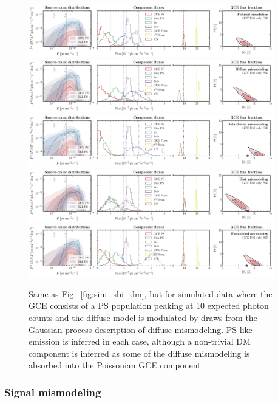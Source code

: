 \documentclass[prd,aps,10pt,nofootinbib,twocolumn,superscriptaddress,preprintnumbers,balancelastpage,longbibliography]{revtex4-1}
\begin{document}
%
\begin{figure}
    \centering
    \includegraphics[width=0.95\textwidth]{plots/sim_sbi_dm_agg.pdf}
    \includegraphics[width=0.95\textwidth]{plots/sim_sbi_modelA_dm.pdf}
    \includegraphics[width=0.95\textwidth]{plots/sim_sbi_dm_mismo.pdf}
    \includegraphics[width=0.95\textwidth]{plots/sim_sbi_thick_disk_mm_dm.pdf}
    \includegraphics[width=0.95\textwidth]{plots/sim_sbi_dm_asym.pdf}

    \caption{Same as Fig.~\ref{fig:sim_sbi_dm}, but for simulated data where the GCE consists of a PS population peaking at 10 expected photon counts and the diffuse model is modulated by draws from the Gaussian process description of diffuse mismodeling. PS-like emission is inferred in each case, although a non-trivial DM component is inferred as some of the diffuse mismodeling is absorbed into the Poissonian GCE component.}
    \label{fig:sim_sbi_ps_mismo}
\end{figure}
%

\subsubsection*{Signal mismodeling}
\end{document}
